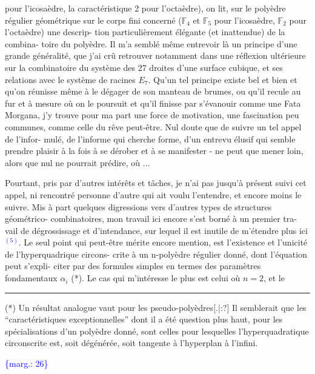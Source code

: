\documentclass[11pt]{article}
\newcommand{\scanpage}[1]{\par\bigskip\noindent{\small\sffamily[scan #1]}\par}
\newcommand{\mspage}[1]{{\small\sffamily[p.\,#1]}}
\newcommand{\hand}[1]{\textcolor{blue}{#1}}
\newcommand{\margin}[1]{\textcolor{blue}{\{\textsf{marg.:} #1\}}}
\newcommand{\unsure}[1]{[#1?]}
\begin{document}
pour l'icosaèdre, la caractéristique 2 pour l'octaèdre), on lit,
sur le polyèdre régulier géométrique sur le corps fini concerné
($\mathbb{F}_4$ et $\mathbb{F}_5$ pour l'icosaèdre, $\mathbb{F}_2$ pour l'octaèdre) une descrip-%
tion particulièrement élégante (et inattendue) de la combina-%
toire du polyèdre. Il m'a semblé même entrevoir là un principe
d'une grande généralité, que j'ai crû retrouver notamment dans
une réflexion ultérieure sur la combinatoire du système des 27
droites d'une surface cubique, et ses relations avec le système
de racines $E_7$. Qu'un tel principe existe bel et bien et qu'on
réunisse même à le dégager de son manteau de brumes, ou qu'il
recule au fur et à mesure où on le poursuit et qu'il finisse par
s'évanouir comme une Fata Morgana, j'y trouve pour ma part une
force de motivation, une fascination peu communes, comme celle du
rêve peut-être. Nul doute que de suivre un tel appel de l'infor-%
mulé, de l'informe qui cherche forme, d'un entrevu
élusif qui semble prendre plaisir à la fois à se dérober et à se
manifester - ne peut que mener loin, alors que nul ne pourrait
prédire, où ...

Pourtant, pris par d'autres intérêts et tâches, je n'ai
pas jusqu'à présent suivi cet appel, ni rencontré personne d'autre
qui ait voulu l'entendre, et encore moins le suivre. Mis à part
quelques digressions vers d'autres types de structures géométrico-
combinatoires, mon travail ici encore s'est borné à un premier tra-%
vail de dégrossissage et d'intendance, sur lequel il est inutile
de m'étendre plus ici\hand{$^{(5)}$}. Le seul point qui peut-être mérite encore
mention, est l'existence et l'unicité de l'hyperquadrique circons-%
crite à un n-polyèdre régulier donné, dont l'équation peut s'expli-%
citer par des formules simples en termes des paramètres fondamentaux
$\alpha_i$ (*). Le cas qui m'intéresse le plus est celui où $n = 2$, et le

\rule{5cm}{0.4pt}

(*) Un résultat analogue vaut pour les pseudo-polyèdres\unsure{.|:} Il semblerait
que les ``caractéristiques exceptionnelles'' dont il a été question plus
haut, pour les spécialisations d'un polyèdre donné, sont celles pour
lesquelles l'hyperquadratique circonscrite est, soit dégénérée, soit
tangente à l'hyperplan à l'infini.

\margin{26}

\clearpage
\scanpage{119/27}
\mspage{25}
\end{document}

